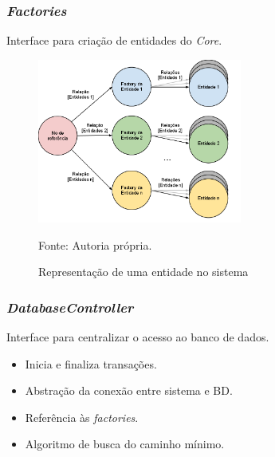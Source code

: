 \frame
{
\frametitle{\emph{Factories}}
Interface para criação de entidades do \emph{Core}.
\begin{figure}
\includegraphics[width=0.6\textwidth]{./imgs/grafoFactory.png}
\caption{Representação de uma entidade no sistema}
\tiny
Fonte: Autoria própria.
\end{figure}
}

\frame
{
\frametitle{\emph{DatabaseController}}
Interface para centralizar o acesso ao banco de dados.
\begin{itemize}
\item Inicia e finaliza transações.
\item Abstração da conexão entre sistema e BD.
\item Referência às \emph{factories}.
\item Algoritmo de busca do caminho mínimo.
\end{itemize}
}


